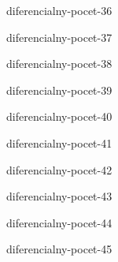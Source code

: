 \begin{defproblem}{diferencialny-pocet-36}

\end{defproblem}

\begin{defproblem}{diferencialny-pocet-37}

\end{defproblem}

\begin{defproblem}{diferencialny-pocet-38}

\end{defproblem}

\begin{defproblem}{diferencialny-pocet-39}

\end{defproblem}

\begin{defproblem}{diferencialny-pocet-40}

\end{defproblem}

\begin{defproblem}{diferencialny-pocet-41}

\end{defproblem}

\begin{defproblem}{diferencialny-pocet-42}

\end{defproblem}

\begin{defproblem}{diferencialny-pocet-43}

\end{defproblem}

\begin{defproblem}{diferencialny-pocet-44}

\end{defproblem}

\begin{defproblem}{diferencialny-pocet-45}

\end{defproblem}